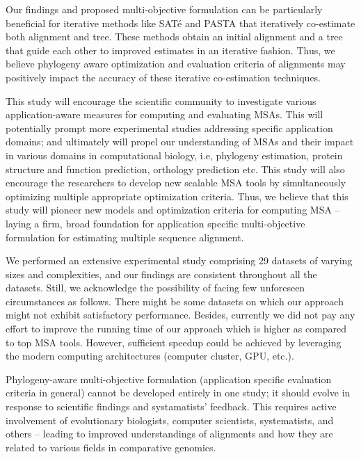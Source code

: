 Our findings and proposed multi-objective formulation can be particularly beneficial for iterative methods like SAT\'e and PASTA that iteratively co-estimate both alignment and tree. These methods obtain an initial alignment and a tree that guide each other to improved estimates in an iterative fashion. Thus, we believe phylogeny aware optimization and evaluation criteria of alignments may positively impact the accuracy of these iterative co-estimation techniques.

This study will encourage the scientific community to investigate various application-aware measures for computing and evaluating MSAs. This will potentially prompt more experimental studies addressing specific application domains; and ultimately will propel our understanding of MSAs and their impact in various domains in computational biology, i.e, phylogeny estimation, protein structure and function prediction, orthology prediction etc. This study will also encourage the researchers to develop new scalable MSA tools by simultaneously optimizing multiple appropriate optimization criteria. Thus, we believe that this study will pioneer new models and optimization criteria for computing MSA -- laying a firm, broad foundation for application specific multi-objective formulation for estimating multiple sequence alignment.

We performed an extensive experimental study comprising 29 datasets of varying sizes and complexities, and our findings are consistent throughout all the datasets. Still, we acknowledge the possibility of facing few unforeseen circumstances as follows. There might be some datasets on which our approach might not exhibit satisfactory performance. Besides, currently we did not pay any effort to improve the running time of our approach which is higher as compared to top MSA tools. However, sufficient speedup could be achieved by leveraging the modern computing architectures (computer cluster, GPU, etc.). 

Phylogeny-aware multi-objective formulation (application specific evaluation criteria in general) cannot be developed entirely in one study; it should evolve in response to scientific findings and systamatists' feedback. This requires active involvement of evolutionary biologists, computer scientists, systematists, and others -- leading to improved understandings of alignments and how they are related to various fields in comparative genomics.





